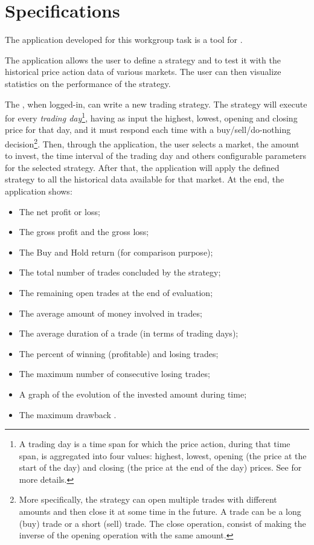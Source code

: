 \chapter{Specifications}\label{ch:specs}

The application developed for this workgroup task is a tool for
.

The application allows the user to define a strategy and to test it with the
historical price action data of various markets. The user can then visualize
statistics on the performance of the strategy.

The , when logged-in, can write a new trading strategy. The
strategy will execute for every \emph{trading day}\footnote{A trading day is a
time span for which the price action, during that time span, is aggregated into
four values: highest, lowest, opening (the price at the start of the day) and
closing (the price at the end of the day) prices. See
 for more details.}, having as input the highest,
lowest, opening and closing price for that day, and it must respond each time
with a buy/sell/do-nothing decision\footnote{More specifically, the strategy can
open multiple trades with different amounts and then close it at some time in
the future. A trade can be a long (buy) trade or a short (sell) trade. The close
operation, consist of making the inverse of the opening operation with the same
amount.}. Then, through the application, the user selects a market, the amount
to invest, the time interval of the trading day and others configurable
parameters for the selected strategy. After that, the application will apply the
defined strategy to all the historical data available for that market. At the
end, the application shows:
\begin{itemize}
	\item The net profit or loss;
	\item The gross profit  and the gross loss;
	\item The Buy and Hold return (for comparison purpose);
	\item The total number of trades concluded by the strategy;
	\item The remaining open trades at the end of evaluation;
	\item The average amount of money involved in trades;
	\item The average duration of a trade (in terms of trading days);
	\item The percent of winning (profitable) and losing trades;
	\item The maximum number of consecutive losing trades;
	\item A graph of the evolution of the invested amount during time;
	\item The maximum drawback .
\end{itemize}

